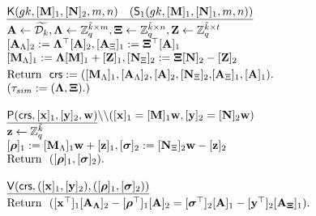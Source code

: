 \begin{figure}
$$
\begin{array}{l}
\begin{array}{l}
    \underline{\algK(gk,[\matr{M}]_1,[\matr{N}]_2,m,n) \quad  (\mathsf{S}_1(gk,[\matr{M}]_1,[\matr{N}]_1,m,n))}\\[.1cm]
    \matr{A} \gets \widetilde{\dist_{k}},\matr{\Lambda} \gets \Z_q^{\tilde{k} \times m}, \matr{\Xi}\gets \Z_q^{\tilde{k}\times n}, \matr{Z} \gets \Z_q^{\tilde{k} \times t}\\
    {[\matr{A}_{\Lambda}]_2:= \matr{\Lambda}^\top [\matr{A}]_2},{[\matr{A}_{\Xi}]_1:= \matr{\Xi}^\top[\matr{A}]_1}\\
    {[\matr{M}_{\Lambda}]_1:=\matr{\Lambda} [\matr{M}]_1+[\matr{Z}]_1},{[\matr{N}_{\Xi}]_2:=\matr{\Xi} [\matr{N}]_2-[\matr{Z}]_2} \\ [.1cm]
    {\text{Return } \ \mathsf{crs}:=([\matr{M}_{\Lambda}]_1, [\matr{A}_\Lambda]_2 , [\matr{A}]_2,[\matr{N}_{\Xi}]_2,}{[\matr{A}_{\Xi}]_1 , [\matr{A}]_1).}\\
    (\tau_{sim}:=(\matr{\Lambda},\matr{\Xi}).)
    \\
    \\    
\end{array}
\\
\begin{array}{l}
    \underline{\algP(\mathsf{crs}, [\vecb{x}]_1, [\vecb{y}]_2, \vecb{w})}\backslash \backslash ([\vecb{x}]_1=[\matr{M}]_1 \vecb{w}, [\vecb{y}]_2=[\matr{N}]_2 \vecb{w})
    \\
    \matr{z} \gets \Z_q^{\tilde{k}}\\
    {[\grkb{\rho}]_1:=[\matr{M}_{\Lambda}]_1 \vecb{w}+ [\vecb{z}]_1},{[\grkb{\sigma}]_2:=[\matr{N}_{\Xi}]_2 \vecb{w}- [\vecb{z}]_2}\\
     \text{Return } \  ([\grkb{\rho}]_1,[\grkb{\sigma}]_2).
    \\
    \\
\end{array}
\\
\begin{array}{l}
    \underline{\algV(\mathsf{crs},([\vecb{x}]_1,[\vecb{y}]_2), ([\grkb{\rho}]_1,[\grkb{\sigma}]_2))}\\ [.1cm]
    \text{Return } \ ([\vecb{x}^\top]_1 [\matr{A_\Lambda}]_2  - [\grkb{\rho^\top}]_1[\matr{A}]_2=  [\grkb{\sigma^\top}]_2 [\matr{A}]_1-[\vecb{y}^\top]_2 [\matr{A_\Xi}]_1).
    \\
    \\
\end{array}

\end{array}$$
\end{figure}
